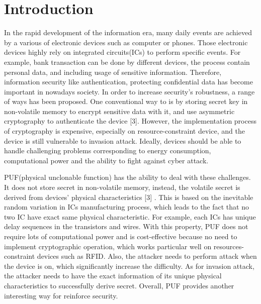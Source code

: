 \chapter{Introduction}

In the rapid development of the information era, many daily events are achieved by a various of electronic devices such as computer or phones.
Those electronic devices highly rely on integrated circuits(ICs) to perform specific events. For example, bank transaction can be done by different devices,
the process contain personal data, and including usage of sensitive information. Therefore, information security like authentication, protecting confidential data
has become important in nowadays society. In order to increase security's robustness, a range of ways has been proposed. One conventional way to is by storing secret key in non-volatile memory to encrypt sensitive data with it,
and use asymmetric cryptography to authenticate the device [3]. However, the implementation process of cryptography is expensive, especially on resource-constraint device, and the device is still vulnerable to invasion attack. Ideally, devices should be able to handle challenging problems corresponding to energy consumption, 
computational power and the ability to fight against cyber attack. \par

PUF(physical unclonable function) has the ability to deal with these challenges. It does not store secret in non-volatile memory, instead, the volatile secret is derived from devices' physical characteristics [3] .
This is based on the inevitable random variation in ICs manufacturing process, which leads to the fact that no two IC have exact same physical characteristic. For example, each ICs has unique delay sequences in the transistors and wires.
With this property, PUF does not require lots of computational power and is cost-effective because no need to implement cryptographic operation, which works particular well on
resources-constraint devices such as RFID. Also, the attacker needs to perform attack when the device is on, which significantly increase the difficulty. As for invasion attack, 
the attacker needs to have the exact information of its unique physical characteristics to successfully derive secret. Overall, PUF provides another interesting way for reinforce security.

